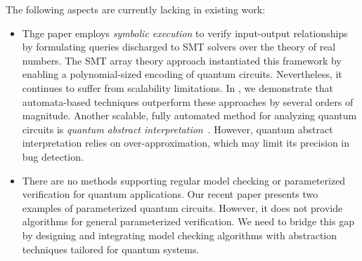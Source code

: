 The following aspects are currently lacking in existing work:
%
\begin{itemize}
\item
Thge paper \citep{BauerMarquartLS23} employs \emph{symbolic execution} \citep{10.1145/360248.360252} to verify input-output relationships by formulating queries discharged to SMT solvers over the theory of real numbers.
%
The SMT array theory approach \citep{DBLP:conf/cade/ChenRT23} instantiated this framework by enabling a polynomial-sized encoding of quantum circuits. Nevertheless, it continues to suffer from scalability limitations.
%
In \citep{DBLP:journals/pacmpl/AbdullaCCHLLLT25,PLanQC25}, we demonstrate that automata-based techniques outperform these approaches by several orders of magnitude.
%
Another scalable, fully automated method for analyzing quantum circuits is \emph{quantum abstract interpretation}~\citep{yu2021quantum,perdrix2008quantum}.
%
However, quantum abstract interpretation relies on over-approximation, which may limit its precision in bug detection.
%

\item
There are no methods supporting regular model checking or parameterized verification for quantum applications.
%
Our recent paper \citep{DBLP:journals/pacmpl/AbdullaCCHLLLT25} presents two examples of parameterized quantum circuits.
%
However, it does not provide algorithms for general parameterized verification.
%
We need to bridge this gap by designing and integrating model checking algorithms with abstraction techniques tailored for quantum systems.
\end{itemize}

